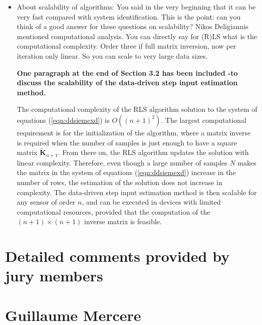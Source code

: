 \documentclass[11pt]{article}
\begin{document}
\begin{itemize}
	\item About scalability of algorithms: You said in the very beginning that it can be very fast compared with system identification. This is the point: can you think of a good answer for these questions on scalability? Nikos Deligiannis mentioned computational analysis. You can directly say for (R)LS what is the computational complexity. Order three if full matrix inversion, now per iteration only linear. So you can scale to very large data sizes.
	
	{\bfseries One paragraph at the end of Section 3.2 has been included -to discuss the scalability of the data-driven step input estimation method.  }
	
	\color{blue}
	The computational complexity of the RLS algorithm solution to the system of equations (\ref{eqn:ddsiemexd}) is $O \left( \left( n+1 \right)^2 \right)$.
    The largest computational requirement is for the initialization of the algorithm, where a matrix inverse is required when the number of samples is just enough to have a square matrix $\widetilde{\mathbf{K}}_{n+1}$.
    From there on, the RLS algorithm updates the solution with linear complexity.
    Therefore, even though a large number of samples $N$ makes the matrix in the system of equations (\ref{eqn:ddsiemexd}) increase in the number of rows, the estimation of the solution does not increase in complexity. 
    The data-driven step input estimation method is then scalable for any sensor of order $n$, and can be executed in devices with limited computational resources, provided that the computation of the  $(n+1) \times (n+1)$ inverse matrix is feasible.
    \color{black}


\end{itemize}

\section*{Detailed comments provided by jury members}

\section*{Guillaume Mercere}
\end{document}
